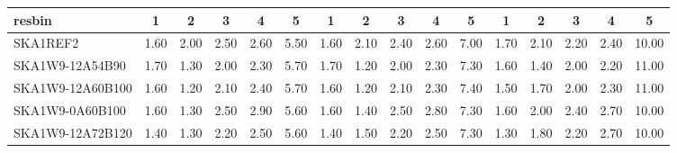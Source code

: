 \begin{table}[H]
{{\begin{tabular}{|lccccc||ccccc||ccccc|}
 resbin  &1 & 2 & 3 & 4 & 5 & 1 & 2 & 3 & 4 & 5 & 1 & 2 & 3 & 4 & 5 \\ \hline
SKA1REF2 & 1.60 \cellcolor{blue!49.50} & 2.00 \cellcolor{red!60.00} & 2.50 \cellcolor{green!60.00} & 2.60 \cellcolor{orange!39.00} & 5.50 \cellcolor{purple!18.00} & 1.60 \cellcolor{blue!49.50} & 2.10 \cellcolor{red!60.00} & 2.40 \cellcolor{green!51.60} & 2.60 \cellcolor{orange!43.20} & 7.00 \cellcolor{purple!18.00} & 1.70 \cellcolor{blue!60.00} & 2.10 \cellcolor{red!60.00} & 2.20 \cellcolor{green!39.00} & 2.40 \cellcolor{orange!28.50} & 10.00 \cellcolor{purple!18.00}\\ \hline 
SKA1W9-12A54B90 & 1.70 \cellcolor{blue!60.00} & 1.30 \cellcolor{red!23.25} & 2.00 \cellcolor{green!18.00} & 2.30 \cellcolor{orange!18.00} & 5.70 \cellcolor{purple!60.00} & 1.70 \cellcolor{blue!60.00} & 1.20 \cellcolor{red!18.00} & 2.00 \cellcolor{green!18.00} & 2.30 \cellcolor{orange!18.00} & 7.30 \cellcolor{purple!49.50} & 1.60 \cellcolor{blue!51.60} & 1.40 \cellcolor{red!18.00} & 2.00 \cellcolor{green!18.00} & 2.20 \cellcolor{orange!18.00} & 11.00 \cellcolor{purple!60.00}\\ \hline 
SKA1W9-12A60B100 & 1.60 \cellcolor{blue!49.50} & 1.20 \cellcolor{red!18.00} & 2.10 \cellcolor{green!26.40} & 2.40 \cellcolor{orange!25.00} & 5.70 \cellcolor{purple!60.00} & 1.60 \cellcolor{blue!49.50} & 1.20 \cellcolor{red!18.00} & 2.10 \cellcolor{green!26.40} & 2.30 \cellcolor{orange!18.00} & 7.40 \cellcolor{purple!60.00} & 1.50 \cellcolor{blue!43.20} & 1.70 \cellcolor{red!36.00} & 2.00 \cellcolor{green!18.00} & 2.30 \cellcolor{orange!23.25} & 11.00 \cellcolor{purple!60.00}\\ \hline 
SKA1W9-0A60B100 & 1.60 \cellcolor{blue!49.50} & 1.30 \cellcolor{red!23.25} & 2.50 \cellcolor{green!60.00} & 2.90 \cellcolor{orange!60.00} & 5.60 \cellcolor{purple!39.00} & 1.60 \cellcolor{blue!49.50} & 1.40 \cellcolor{red!27.33} & 2.50 \cellcolor{green!60.00} & 2.80 \cellcolor{orange!60.00} & 7.30 \cellcolor{purple!49.50} & 1.60 \cellcolor{blue!51.60} & 2.00 \cellcolor{red!54.00} & 2.40 \cellcolor{green!60.00} & 2.70 \cellcolor{orange!44.25} & 10.00 \cellcolor{purple!18.00}\\ \hline 
SKA1W9-12A72B120 & 1.40 \cellcolor{blue!28.50} & 1.30 \cellcolor{red!23.25} & 2.20 \cellcolor{green!34.80} & 2.50 \cellcolor{orange!32.00} & 5.60 \cellcolor{purple!39.00} & 1.40 \cellcolor{blue!28.50} & 1.50 \cellcolor{red!32.00} & 2.20 \cellcolor{green!34.80} & 2.50 \cellcolor{orange!34.80} & 7.30 \cellcolor{purple!49.50} & 1.30 \cellcolor{blue!26.40} & 1.80 \cellcolor{red!42.00} & 2.20 \cellcolor{green!39.00} & 2.70 \cellcolor{orange!44.25} & 10.00 \cellcolor{purple!18.00}\\ \hline 

\end{tabular}}}
\end{table}
